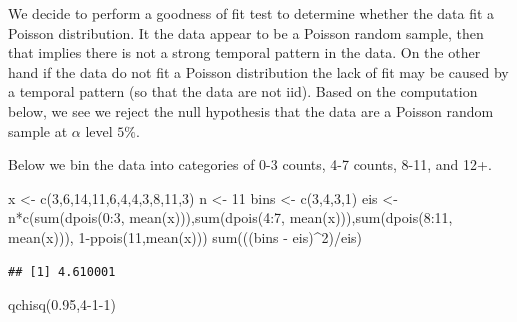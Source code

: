 \documentclass[
]{book}
\newenvironment{Shaded}{\begin{snugshade}}{\end{snugshade}}
\newcommand{\DecValTok}[1]{\textcolor[rgb]{0.00,0.00,0.81}{#1}}
\newcommand{\FloatTok}[1]{\textcolor[rgb]{0.00,0.00,0.81}{#1}}
\newcommand{\FunctionTok}[1]{\textcolor[rgb]{0.00,0.00,0.00}{#1}}
\newcommand{\NormalTok}[1]{#1}
\newcommand{\OtherTok}[1]{\textcolor[rgb]{0.56,0.35,0.01}{#1}}
\newcommand{\SpecialCharTok}[1]{\textcolor[rgb]{0.00,0.00,0.00}{#1}}
\begin{document}
We decide to perform a goodness of fit test to determine whether the data fit a Poisson distribution. It the data appear to be a Poisson random sample, then that implies there is not a strong temporal pattern in the data. On the other hand if the data do not fit a Poisson distribution the lack of fit may be caused by a temporal pattern (so that the data are not iid). Based on the computation below, we see we reject the null hypothesis that the data are a Poisson random sample at \(\alpha\) level \(5\%\).

Below we bin the data into categories of 0-3 counts, 4-7 counts, 8-11, and 12+.

\begin{Shaded}
\begin{Highlighting}[]
\NormalTok{x }\OtherTok{\textless{}{-}} \FunctionTok{c}\NormalTok{(}\DecValTok{3}\NormalTok{,}\DecValTok{6}\NormalTok{,}\DecValTok{14}\NormalTok{,}\DecValTok{11}\NormalTok{,}\DecValTok{6}\NormalTok{,}\DecValTok{4}\NormalTok{,}\DecValTok{4}\NormalTok{,}\DecValTok{3}\NormalTok{,}\DecValTok{8}\NormalTok{,}\DecValTok{11}\NormalTok{,}\DecValTok{3}\NormalTok{)}
\NormalTok{n }\OtherTok{\textless{}{-}} \DecValTok{11}
\NormalTok{bins }\OtherTok{\textless{}{-}} \FunctionTok{c}\NormalTok{(}\DecValTok{3}\NormalTok{,}\DecValTok{4}\NormalTok{,}\DecValTok{3}\NormalTok{,}\DecValTok{1}\NormalTok{)}
\NormalTok{eis }\OtherTok{\textless{}{-}}\NormalTok{ n}\SpecialCharTok{*}\FunctionTok{c}\NormalTok{(}\FunctionTok{sum}\NormalTok{(}\FunctionTok{dpois}\NormalTok{(}\DecValTok{0}\SpecialCharTok{:}\DecValTok{3}\NormalTok{, }\FunctionTok{mean}\NormalTok{(x))),}\FunctionTok{sum}\NormalTok{(}\FunctionTok{dpois}\NormalTok{(}\DecValTok{4}\SpecialCharTok{:}\DecValTok{7}\NormalTok{, }\FunctionTok{mean}\NormalTok{(x))),}\FunctionTok{sum}\NormalTok{(}\FunctionTok{dpois}\NormalTok{(}\DecValTok{8}\SpecialCharTok{:}\DecValTok{11}\NormalTok{, }\FunctionTok{mean}\NormalTok{(x))),   }\DecValTok{1}\SpecialCharTok{{-}}\FunctionTok{ppois}\NormalTok{(}\DecValTok{11}\NormalTok{,}\FunctionTok{mean}\NormalTok{(x)))}
\FunctionTok{sum}\NormalTok{(((bins }\SpecialCharTok{{-}}\NormalTok{ eis)}\SpecialCharTok{\^{}}\DecValTok{2}\NormalTok{)}\SpecialCharTok{/}\NormalTok{eis)}
\end{Highlighting}
\end{Shaded}

\begin{verbatim}
## [1] 4.610001
\end{verbatim}

\begin{Shaded}
\begin{Highlighting}[]
\FunctionTok{qchisq}\NormalTok{(}\FloatTok{0.95}\NormalTok{,}\DecValTok{4{-}1{-}1}\NormalTok{)}
\end{Highlighting}
\end{Shaded}
\end{document}
